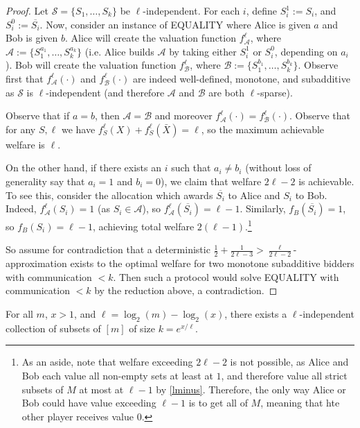 \begin{proof}
Let $\mathcal{S} = \{S_1,\ldots, S_k\}$ be $\ell$-independent. For each $i$, define $S_i^1:= S_i$, and $S_i^0 := \overline{S_i}$. Now, consider an instance of EQUALITY where Alice is given $a$ and Bob is given $b$. Alice will create the valuation function $f^\ell_\mathcal{A}$, where $\mathcal{A}:=\{S_1^{a_1},\ldots, S_k^{a_k}\}$ (i.e. Alice builds $\mathcal{A}$ by taking either $S_i^1$ or $S_i^0$, depending on $a_i$). Bob will create the valuation function $f^\ell_\mathcal{B}$, where $\mathcal{B}:=\{S_1^{b_1},\ldots, S_k^{b_k}\}$. Observe first that $f^\ell_\mathcal{A}(\cdot)$ and $f^\ell_\mathcal{B}(\cdot)$ are indeed well-defined, monotone, and subadditive as $\mathcal{S}$ is $\ell$-independent (and therefore $\mathcal{A}$ and $\mathcal{B}$ are both $\ell$-sparse). 

Observe that if $a = b$, then $\mathcal{A} = \mathcal{B}$ and moreover $f^\ell_\mathcal{A}(\cdot) = f^\ell_\mathcal{B}(\cdot)$. Observe that for any $S, \ell$ we have $f_S^\ell(X) + f_S^\ell(\bar{X}) =\ell$, so the maximum achievable welfare is $\ell$.

On the other hand, if there exists an $i$ such that $a_i \neq b_i$ (without loss of generality say that $a_i = 1$ and $b_i = 0$), we claim that welfare $2\ell-2$ is achievable. To see this, consider the allocation which awards $\overline{S_i}$ to Alice and $S_i$ to Bob. Indeed, $f^\ell_\mathcal{A}(S_i) = 1$ (as $S_i \in \mathcal{A}$), so $f^\ell_\mathcal{A}(\overline{S_i}) = \ell - 1$. Similarly, $f_B(\overline{S_i}) = 1$, so $f_B(S_i) = \ell - 1$, achieving total welfare $2(\ell-1)$.\footnote{As an aside, note that welfare exceeding $2\ell-2$ is not possible, as Alice and Bob each value all non-empty sets at least at $1$, and therefore value all strict subsets of $M$ at most at $\ell-1$ by \ref{lminus}. Therefore, the only way Alice or Bob could have value exceeding $\ell-1$ is to get all of $M$, meaning that hte other player receives value $0$.} 

So assume for contradiction that a deterministic $\frac{1}{2} + \frac{1}{2\ell-3} > \frac{\ell}{2\ell-2}$-approximation exists to the optimal welfare for two monotone subadditive bidders with communication $< k$. Then such a protocol would solve EQUALITY with communication $<k$ by the reduction above, a contradiction.
\end{proof}

\begin{lemma}
\label{lem:l-indep-exist}
For all $m$, $x > 1$, and $\ell = \log_2(m) - \log_2(x)$, there exists a $\ell$-independent collection of subsets of $[m]$ of size $k = e^{x/\ell}$.
\end{lemma}


